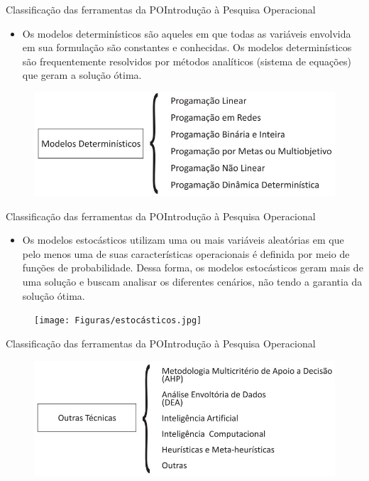 \documentclass[t]{beamer}
\begin{document}

\begin{ftst}{Classificação das ferramentas da PO}{Introdução à Pesquisa Operacional}
\begin{itemize}
    \item Os modelos determinísticos são aqueles em que todas as variáveis envolvida em sua formulação são constantes e conhecidas. Os modelos determinísticos são frequentemente resolvidos por métodos analíticos (sistema de equações) que geram a solução ótima.
\end{itemize}

\begin{figure}
    \centering
    \includegraphics[scale=0.5]{Figuras/deterministicos.jpg}
\end{figure}
\end{ftst}


\begin{ftst}{Classificação das ferramentas da PO}{Introdução à Pesquisa Operacional}
\begin{itemize}
    \item Os modelos estocásticos utilizam uma ou mais variáveis aleatórias em que pelo menos uma de suas características operacionais é definida por meio de funções de probabilidade. Dessa forma, os modelos estocásticos geram mais de uma solução e buscam analisar os diferentes cenários, não tendo a garantia da solução ótima.
\end{itemize}

\begin{figure}
    \centering
    \texttt{[image: Figuras/estocásticos.jpg]}
\end{figure}
\end{ftst}


\begin{ftst}{Classificação das ferramentas da PO}{Introdução à Pesquisa Operacional}

\begin{figure}
    \centering
    \includegraphics[scale=0.5]{Figuras/outras_tecnicas.jpg}
\end{figure}
\end{ftst}

\end{document}
